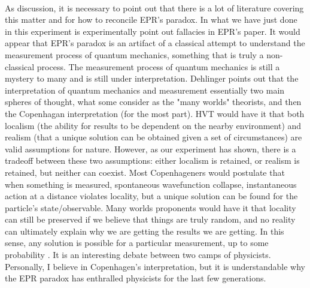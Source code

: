 \documentclass{article}
\begin{document}
    \\\indent As discussion, it is necessary to point out that there is a lot of literature covering this matter and for how to reconcile EPR's paradox. In what we have just done in this experiment is experimentally point out fallacies in EPR's paper. It would appear that EPR's paradox is an artifact of a classical attempt to understand the measurement process of quantum mechanics, something that is truly a non-classical process. The measurement process of quantum mechanics is still a mystery to many and is still under interpretation. Dehlinger points out that the interpretation of quantum mechanics and measurement essentially two main spheres of thought, what some consider as the "many worlds" theorists, and then the Copenhagan interpretation (for the most part). HVT would have it that both localism (the ability for results to be dependent on the nearby environment) and realism (that a unique solution can be obtained given a set of circumstances) are valid assumptions for nature. However, as our experiment has shown, there is a tradeoff between these two assumptions: either localism is retained, or realism is retained, but neither can coexist. Most Copenhageners would postulate that when something is measured, spontaneous wavefunction collapse, instantaneous action at a distance violates locality, but a unique solution can be found for the particle's state/observable. Many worlds proponents would have it that locality can still be preserved if we believe that things are truly random, and no reality can ultimately explain why we are getting the results we are getting. In this sense, any solution is possible for a particular measurement, up to some probability \cite{deh}. It is an interesting debate between two camps of physicists. Personally, I believe in Copenhagen's interpretation, but it is understandable why the EPR paradox has enthralled physicists for the last few generations.
    
\end{document}
